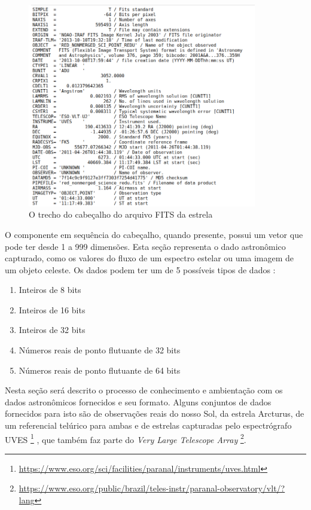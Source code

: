 \begin{figure}[htb]
\centering
\includegraphics[width=10cm]{figuras/fits_header.png}
\caption{O trecho do cabeçalho do arquivo FITS da estrela }
\label{fig:fits-header}
\end{figure}

O componente em sequência do cabeçalho, quando presente, possui um vetor que pode ter desde 1 a 999 dimensões. Esta seção representa o dado astronômico capturado, como os valores do fluxo de um espectro estelar ou uma imagem de um objeto celeste. Os dados podem ter um de 5 possíveis tipos de dados \citep{pence2010definition}:

\begin{enumerate}
    \item Inteiros de 8 bits
    \item Inteiros de 16 bits
    \item Inteiros de 32 bits
    \item Números reais de ponto flutuante de 32 bits
    \item Números reais de ponto flutuante de 64 bits
\end{enumerate}

Nesta seção será descrito o processo de conhecimento e ambientação com os dados astronômicos fornecidos e seu formato. Alguns conjuntos de dados fornecidos para isto são de observações reais do nosso Sol, da estrela Arcturus, de um referencial telúrico para ambas e de estrelas capturadas pelo espectrógrafo UVES \footnote{\url{https://www.eso.org/sci/facilities/paranal/instruments/uves.html}} \citep{2000SPIE.4008..534D}, que também faz parte do \textit{Very Large Telescope Array} \footnote{\url{https://www.eso.org/public/brazil/teles-instr/paranal-observatory/vlt/?lang}}. 

